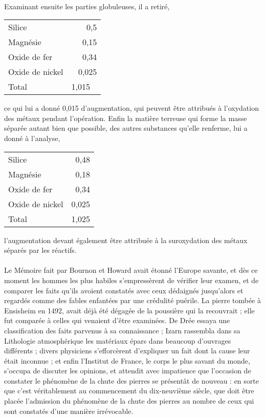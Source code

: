 \documentclass[a4paper, 12pt, oneside, french]{article}
\begin{document}
\paragraph{}
Examinant ensuite les parties globuleuses, il a retiré,
\begin{table}[H]
    \centering
    \begin{tabular}{l r}
        Silice & 0,5 \\
        Magnésie & 0,15 \\
        Oxide de fer & 0,34 \\
        Oxide de nickel & 0,025 \\ \hline
        Total & 1,015 \
    \end{tabular}
\end{table}
ce qui lui a donné 0,015 d'augmentation, qui peuvent être attribués à l'oxydation des métaux pendant l'opération. Enfin la matière terreuse qui forme la masse séparée autant bien que possible, des autres substances qu'elle renferme, lui a donné à l'analyse,
\begin{table}[H]
    \centering
    \begin{tabular}{l r}
        Silice & 0,48 \\
        Magnésie & 0,18 \\
        Oxide de fer & 0,34 \\
        Oxide de nickel & 0,025 \\ \hline
        Total & 1,025 \\
    \end{tabular}
\end{table}
l'augmentation devant également être attribuée à la suroxydation des métaux séparés par les réactifs.
\paragraph{}
Le Mémoire fait par Bournon et Howard avait étonné l'Europe savante, et dès ce moment les hommes les plus habiles s'empressèrent de vérifier leur examen, et de comparer les faits qu'ils avoient constatés avec ceux dédaignés jusqu'alors et regardés comme des fables enfantées par une crédulité puérile. La pierre tombée à Ensisheim en 1492, avait déjà été dégagée de la poussière qui la recouvrait ; elle fut comparée à celles qui venaient d'être examinées. De Drée essaya une classification des faits parvenus à sa connaissance ; Izarn rassembla dans sa Lithologie atmosphérique les matériaux épars dans beaucoup d'ouvrages différents ; divers physiciens s'efforcèrent d'expliquer un fait dont la cause leur était inconnue ; et enfin l'Institut de France, le corps le plus savant du monde, s'occupa de discuter les opinions, et attendit avec impatience que l'occasion de constater le phénomène de la chute des pierres se présentât de nouveau : en sorte que c'est véritablement au commencement du dix-neuvième siècle, que doit être placée l'admission du phénomène de la chute des pierres au nombre de ceux qui sont constatés d'une manière irrévocable.
\end{document}
